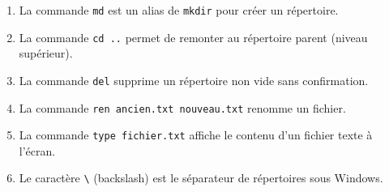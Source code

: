 \documentclass[11pt]{article}
\begin{document}
\begin{exercice}
\begin{enumerate}
    \item La commande \texttt{md} est un alias de \texttt{mkdir} pour créer un répertoire.
    \item La commande \texttt{cd ..} permet de remonter au répertoire parent (niveau supérieur).
    \item La commande \texttt{del} supprime un répertoire non vide sans confirmation.
    \item La commande \texttt{ren ancien.txt nouveau.txt} renomme un fichier.
    \item La commande \texttt{type fichier.txt} affiche le contenu d'un fichier texte à l'écran.
    \item Le caractère \texttt{\textbackslash} (backslash) est le séparateur de répertoires sous Windows.
\end{enumerate}
\end{exercice}
\end{document}
